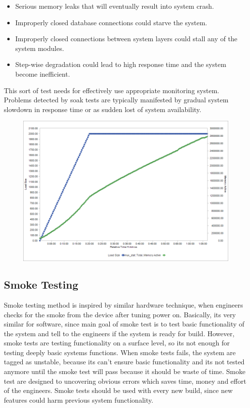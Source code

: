 \begin{itemize}
	\setlength\itemsep{0em}
	\item Serious memory leaks that will eventually result into system crash.
	\item Improperly closed database connections could starve the system.
	\item Improperly closed connections between system layers could stall any of the system modules.
	\item Step-wise degradation could lead to high response time and the system become inefficient.
\end{itemize}

This sort of test needs for effectively use appropriate monitoring system. Problems detected by soak tests are typically manifested by gradual system slowdown in response time or as sudden lost of system availability.

\begin{figure}[H]
  \centering
  \includegraphics[width=15cm]{obrazky-figures/soak-testing.png}
  \caption{}
  \label{fig:soak_test}
\end{figure}

\subsection*{Smoke Testing}
Smoke testing method is inspired by similar hardware technique, when engineers checks for the smoke from the device after tuning power on. Basically, its very similar for software, since main goal of smoke test is to test basic functionality of the system and tell to the engineers if the system is ready for build. However, smoke tests are testing functionality on a surface level, so its not enough for testing deeply basic systems functions. When smoke tests fails, the system are tagged as unstable, because its can't ensure basic functionality and its not tested anymore until the smoke test will pass because it should be waste of time. Smoke test are designed to uncovering obvious errors which saves time, money and effort of the engineers. Smoke tests should be used with every new build, since new features could harm previous system functionality. 


